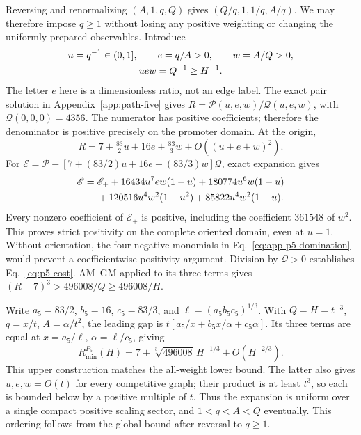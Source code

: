 \documentclass[aps,pre,reprint,amsmath,amssymb,longbibliography]{revtex4-2}
\begin{document}
Reversing and renormalizing \((A,1,q,Q)\) gives
\((Q/q,1,1/q,A/q)\). We may therefore impose \(q\ge1\)
without losing any positive weighting or changing the uniformly
prepared observables. Introduce
 \begin{gather}
 u=q^{-1}\in(0,1],\qquad e=q/A>0,\qquad w=A/Q>0, \notag \\
 uew=Q^{-1}\ge H^{-1}.  \label{eq:app-p5-coordinates}
\end{gather}
The letter \(e\) here is a dimensionless ratio, not an edge label.
The exact pair solution in Appendix~\ref{app:path-five} gives
\(R=\mathscr P(u,e,w)/\mathscr Q(u,e,w)\), with
\(\mathscr Q(0,0,0)=4356\). The numerator has positive coefficients;
therefore the denominator is positive precisely on the promoter domain.
At the origin,
\begin{equation}
 R=7+\tfrac{83}{2}u+16e+\tfrac{83}{3}w
       +O((u+e+w)^2).
 \label{eq:app-p5-local}
\end{equation}
For \(\mathscr E=\mathscr P-
[7+(83/2)u+16e+(83/3)w]\mathscr Q\), exact expansion gives
\begin{align}
 \mathscr E={}&\mathscr E_+
 +16434u^7ew(1-u)+180774u^6w(1-u)\notag\\
 &+120516u^4w^2(1-u^2)+85822u^4w^2(1-u).
 \label{eq:app-p5-domination}
\end{align}
Every nonzero coefficient of \(\mathscr E_+\) is positive, including
the coefficient \(361548\) of \(w^2\). This proves strict positivity
on the complete oriented domain, even at \(u=1\). Without orientation,
the four negative monomials in Eq.~\eqref{eq:app-p5-domination}
would prevent a coefficientwise positivity argument. Division by \(\mathscr Q>0\)
establishes Eq.~\eqref{eq:p5-cost}. AM--GM applied to its three
terms gives \((R-7)^3>496008/Q\ge496008/H\).

Write \(a_5=83/2\), \(b_5=16\), \(c_5=83/3\), and
\(\ell=(a_5b_5c_5)^{1/3}\). With
\(Q=H=t^{-3}\), \(q=x/t\), \(A=\alpha/t^2\), the leading
gap is \(t[a_5/x+b_5x/\alpha+c_5\alpha]\).
Its three terms are equal at
\(x=a_5/\ell\), \(\alpha=\ell/c_5\), giving
\begin{equation}
 R_{\min}^{P_5}(H)=7+\sqrt[3]{496008}\,H^{-1/3}
                         +O(H^{-2/3}).
 \label{eq:app-p5-optimum}
\end{equation}
This upper construction matches the all-weight lower bound. The latter
also gives \(u,e,w=O(t)\) for every competitive graph; their product
is at least \(t^3\), so each is bounded below by a positive multiple
of \(t\). Thus the expansion is uniform over a single compact positive
scaling sector, and \(1<q<A<Q\) eventually. This ordering follows from
the global bound after reversal to \(q\ge1\).
\end{document}
